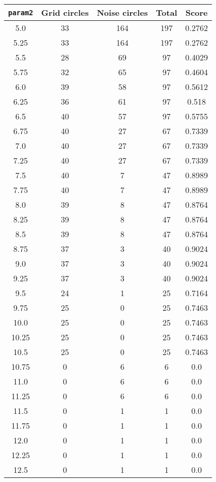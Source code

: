 \documentclass[letterpaper, 12pt]{article}
\begin{document}
\begin{longtable}{|c|c|c|c|c|}
\hline
\textbf{\texttt{param2}} & \textbf{Grid circles} & \textbf{Noise circles} & \textbf{Total} & \textbf{Score} \\
\hline
5.0 & 33 & 164 & 197 & 0.2762 \\
\hline
5.25 & 33 & 164 & 197 & 0.2762 \\
\hline
5.5 & 28 & 69 & 97 & 0.4029 \\
\hline
5.75 & 32 & 65 & 97 & 0.4604 \\
\hline
6.0 & 39 & 58 & 97 & 0.5612 \\
\hline
6.25 & 36 & 61 & 97 & 0.518 \\
\hline
6.5 & 40 & 57 & 97 & 0.5755 \\
\hline
6.75 & 40 & 27 & 67 & 0.7339 \\
\hline
7.0 & 40 & 27 & 67 & 0.7339 \\
\hline
7.25 & 40 & 27 & 67 & 0.7339 \\
\hline
7.5 & 40 & 7 & 47 & 0.8989 \\
\hline
7.75 & 40 & 7 & 47 & 0.8989 \\
\hline
8.0 & 39 & 8 & 47 & 0.8764 \\
\hline
8.25 & 39 & 8 & 47 & 0.8764 \\
\hline
8.5 & 39 & 8 & 47 & 0.8764 \\
\hline
8.75 & 37 & 3 & 40 & 0.9024 \\
\hline
9.0 & 37 & 3 & 40 & 0.9024 \\
\hline
9.25 & 37 & 3 & 40 & 0.9024 \\
\hline
9.5 & 24 & 1 & 25 & 0.7164 \\
\hline
9.75 & 25 & 0 & 25 & 0.7463 \\
\hline
10.0 & 25 & 0 & 25 & 0.7463 \\
\hline
10.25 & 25 & 0 & 25 & 0.7463 \\
\hline
10.5 & 25 & 0 & 25 & 0.7463 \\
\hline
10.75 & 0 & 6 & 6 & 0.0 \\
\hline
11.0 & 0 & 6 & 6 & 0.0 \\
\hline
11.25 & 0 & 6 & 6 & 0.0 \\
\hline
11.5 & 0 & 1 & 1 & 0.0 \\
\hline
11.75 & 0 & 1 & 1 & 0.0 \\
\hline
12.0 & 0 & 1 & 1 & 0.0 \\
\hline
12.25 & 0 & 1 & 1 & 0.0 \\
\hline
12.5 & 0 & 1 & 1 & 0.0 \\

\end{longtable}
\end{document}
